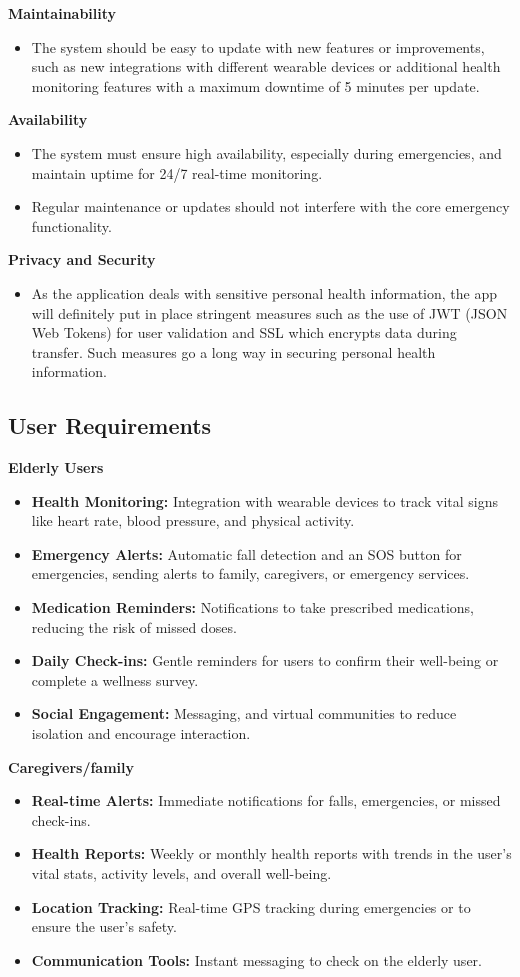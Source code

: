 \textbf{Maintainability}
    \begin{itemize}
        \item The system should be easy to update with new features or improvements, such as new integrations with different wearable devices or additional health monitoring features with a maximum downtime of 5 minutes per update.
    \end{itemize}
\textbf{Availability}
    \begin{itemize}
        \item  The system must ensure high availability, especially during emergencies, and maintain uptime for 24/7 real-time monitoring.
        \item  Regular maintenance or updates should not interfere with the core emergency functionality.
    \end{itemize}
\textbf{ Privacy and Security}
    \begin{itemize}
        \item As the application deals with sensitive personal health information, the app will definitely put in place stringent measures such as the use of JWT (JSON Web Tokens) for user validation and SSL which encrypts data during transfer. Such measures go a long way in securing personal health information.
    \end{itemize}
\subsection{User Requirements} 
\textbf{\large Elderly Users} 
\begin{itemize}
    \item \textbf{Health Monitoring:} Integration with wearable devices to track vital signs like heart rate, blood pressure, and physical activity. 
    \item \textbf{Emergency Alerts:} Automatic fall detection and an SOS button for emergencies, sending alerts to family, caregivers, or emergency services.
    \item \textbf{Medication Reminders:} Notifications to take prescribed medications, reducing the risk of missed doses. 
    \item \textbf{Daily Check-ins:} Gentle reminders for users to confirm their well-being or complete a wellness survey.
    \item \textbf{Social Engagement:} Messaging, and virtual communities to reduce isolation and encourage interaction.
\end{itemize}
\textbf{\large Caregivers/family} 
\begin{itemize}
    \item \textbf{Real-time Alerts:} Immediate notifications for falls, emergencies, or missed check-ins.
    \item \textbf{Health Reports:} Weekly or monthly health reports with trends in the user's vital stats, activity levels, and overall well-being.
    \item \textbf{Location Tracking:} Real-time GPS tracking during emergencies or to ensure the user's safety.
    \item \textbf{Communication Tools:} Instant messaging to check on the elderly user.
\end{itemize}
